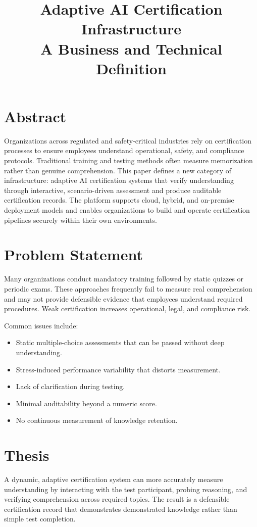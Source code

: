 \documentclass[11pt]{article}
\title{Adaptive AI Certification Infrastructure\\
\large A Business and Technical Definition}
\author{}
\date{}
\begin{document}
\maketitle
\onehalfspacing

\section*{Abstract}
Organizations across regulated and safety-critical industries rely on certification processes to ensure employees understand operational, safety, and compliance protocols. Traditional training and testing methods often measure memorization rather than genuine comprehension. This paper defines a new category of infrastructure: adaptive AI certification systems that verify understanding through interactive, scenario-driven assessment and produce auditable certification records. The platform supports cloud, hybrid, and on-premise deployment models and enables organizations to build and operate certification pipelines securely within their own environments.

\section{Problem Statement}
Many organizations conduct mandatory training followed by static quizzes or periodic exams. These approaches frequently fail to measure real comprehension and may not provide defensible evidence that employees understand required procedures. Weak certification increases operational, legal, and compliance risk.

Common issues include:
\begin{itemize}[noitemsep]
\item Static multiple-choice assessments that can be passed without deep understanding.
\item Stress-induced performance variability that distorts measurement.
\item Lack of clarification during testing.
\item Minimal auditability beyond a numeric score.
\item No continuous measurement of knowledge retention.
\end{itemize}

\section{Thesis}
A dynamic, adaptive certification system can more accurately measure understanding by interacting with the test participant, probing reasoning, and verifying comprehension across required topics. The result is a defensible certification record that demonstrates demonstrated knowledge rather than simple test completion.
\end{document}
